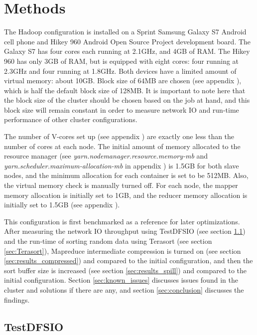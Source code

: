 \documentclass[10pt,journal,compsoc,float]{IEEEtran}
\begin{document}
\section{Methods}
\label{sec:methods}

The Hadoop configuration is installed on a Sprint Samsung Galaxy S7 Android cell phone and Hikey 960 Android Open Source Project development board. The Galaxy S7 has four cores each running at 2.1GHz, and 4GB of RAM. The Hikey 960 has only 3GB of RAM, but is equipped with eight cores: four running at 2.3GHz and four running at 1.8GHz. Both devices have a limited amount of virtual memory: about 10GB. Block size of 64MB are chosen (see appendix ), which is half the default block size of 128MB. It is important to note here that the block size of the cluster should be chosen based on the job at hand, and this block size will remain constant in order to measure network IO and run-time performance of other cluster configurations.

The number of V-cores set up (see appendix ) are exactly one less than the number of cores at each node. The initial amount of memory allocated to the resource manager (see \textit{yarn.nodemanager.resource.memory-mb} and \textit{yarn.scheduler.maximum-allocation-mb} in appendix ) is 1.5GB for both slave nodes, and the minimum allocation for each container is set to be 512MB. Also, the virtual memory check is manually turned off. For each node, the mapper memory allocation is initially set to 1GB, and the reducer memory allocation is initially set to 1.5GB (see appendix ).

This configuration is first benchmarked as a reference for later optimizations. After measuring the network IO throughput using TestDFSIO (see section \ref{sec:TestDFSIO}) and the run-time of sorting random data using Terasort (see section \ref{sec:Terasort}), Mapreduce intermediate compression is turned on (see section \ref{sec:results_compressed}) and compared to the initial configuration, and then the sort buffer size is increased (see section \ref{sec:results_spill}) and compared to the initial configuration. Section \ref{sec:known_issues} discusses issues found in the cluster and solutions if there are any, and section \ref{sec:conclusion} discusses the findings.

\subsection{TestDFSIO}
\label{sec:TestDFSIO}
\end{document}
